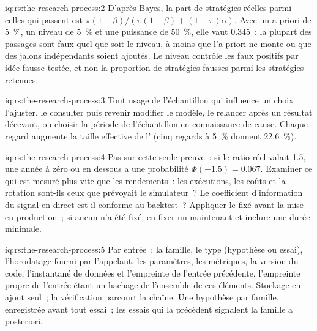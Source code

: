 \begin{solution}{iq:rs:the-research-process:2}
D'après Bayes, la part de stratégies réelles parmi celles qui passent est $\pi(1 - \beta)/(\pi(1 - \beta) + (1 - \pi)\alpha)$. Avec un a priori de 5~\%,
un niveau de 5~\% et une puissance de 50~\%, elle vaut 0.345~: la plupart des passages sont faux quel que soit le niveau, à moins que l'a priori ne monte ou que des jalons indépendants
soient ajoutés. Le niveau contrôle les faux positifs par idée fausse testée, et non la proportion de stratégies fausses parmi les stratégies retenues.
\end{solution}

\begin{solution}{iq:rs:the-research-process:3}
Tout usage de l'échantillon qui influence un choix~: l'ajuster, le consulter puis revenir modifier le modèle, le relancer après un
résultat décevant, ou choisir la période de l'échantillon en connaissance de cause. Chaque regard augmente la taille effective de l' (cinq
regards à 5~\% donnent 22.6~\%).
\end{solution}

\begin{solution}{iq:rs:the-research-process:4}
Pas sur cette seule preuve~: si le ratio réel valait 1.5, une année à zéro ou en dessous a une probabilité $\Phi(-1.5) = 0.067$. Examiner ce qui
est mesuré plus vite que les rendements~: les exécutions, les coûts et la rotation sont-ils ceux que prévoyait le simulateur~? Le coefficient d'information du signal
en direct est-il conforme au backtest~? Appliquer le  fixé avant la mise en production~; si aucun n'a été fixé, en fixer un maintenant et
inclure une durée minimale.
\end{solution}

\begin{solution}{iq:rs:the-research-process:5}
Par entrée~: la famille, le type (hypothèse ou essai), l'horodatage fourni par l'appelant, les paramètres, les métriques, la version du code, l'instantané de données et
l'empreinte de l'entrée précédente, l'empreinte propre de l'entrée étant un hachage de l'ensemble de ces éléments. Stockage en ajout seul~; la vérification parcourt
la chaîne. Une hypothèse par famille, enregistrée avant tout essai~; les essais qui la précèdent signalent la famille a posteriori.
\end{solution}

